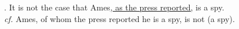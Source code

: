 \noindent\parbox[b]{\textwidth}{
\ex. It is not the case that Ames\underline{, as the press reported,} is
a spy.\\
\textit{cf.} Ames, of whom the press reported he is a spy, is not (a spy).\\

}
%
%
